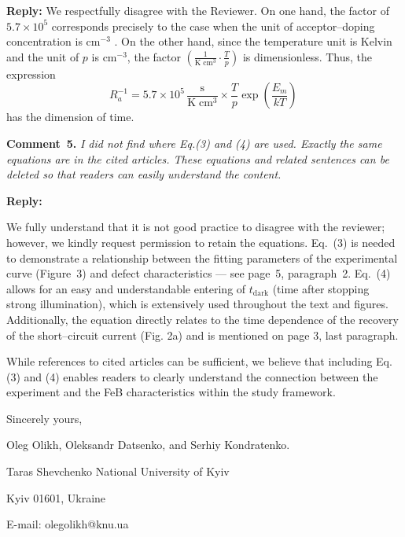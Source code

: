 \documentclass{WileyMSP-template}
\begin{document}
\noindent
\textcolor[rgb]{0.51,0.00,0.00}{\textbf{Reply:}}
We respectfully disagree with the Reviewer.
On one hand, the factor of $5.7\times10^5$
corresponds precisely to the case
when the unit of acceptor--doping concentration is cm$^{-3}$ \cite{FeBAssJAP2014,FeBKin2019,FeBAssSST2011}.
On the other hand,
since the temperature unit is Kelvin
and the unit of $p$ is cm$^{-3}$,
the factor $\left(\frac{1}{\mathrm{K}\;\mathrm{cm}^3}\cdot\frac{T}{p}\right)$ is dimensionless.
Thus, the expression
\begin{equation}
\label{eqTass}
R_a^{-1}=5.7\times10^5\,\frac{\mathrm{s}}{\mathrm{K}\;\mathrm{cm}^3}\times\frac{T}{p}\exp\left(\frac{E_m}{kT}\right)\,
\end{equation}
has the dimension of time.







\vspace{1cm}
\noindent
\textcolor[rgb]{0.00,0.50,1.00}{\textbf{Comment~5.}}
\emph{ I did not find where Eq.(3) and (4) are used.
Exactly the same equations are in the cited articles.
These equations and related sentences can be deleted so that readers can easily understand the content.}

\noindent
\textcolor[rgb]{0.51,0.00,0.00}{\textbf{Reply:}}

We fully understand that it is not good practice to disagree with the reviewer;
however, we kindly request permission to retain the equations.
Eq.~(3) is needed to demonstrate a relationship between the fitting parameters of the experimental curve
(Figure~3) and defect characteristics --- see page~5, paragraph~2.
Eq.~(4) allows for an easy and understandable entering of $t_\mathrm{dark}$
(time after stopping strong illumination),
which is extensively used throughout the text and figures.
Additionally, the equation directly relates to the time dependence of the recovery of the short--circuit current (Fig. 2a)
and is mentioned on page 3, last paragraph.

While references to cited articles can be sufficient,
we believe that including Eq.(3) and (4) enables readers to clearly understand
the connection between the experiment and the FeB characteristics within the study framework.





\vspace{3cm}

Sincerely yours,

Oleg Olikh, Oleksandr Datsenko, and Serhiy Kondratenko.


Taras Shevchenko National University of Kyiv


Kyiv 01601, Ukraine

E-mail: olegolikh@knu.ua



\end{document}
